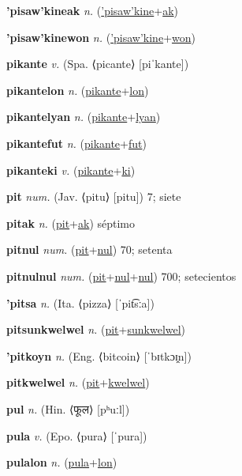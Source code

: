 \textbf{\hypertarget{'pisaw'kineak}{'pisaw'kineak}} \textit{n.} (\hyperlink{'pisaw'kine}{'pisaw'kine}+\allowbreak \hyperlink{ak}{ak})


\textbf{\hypertarget{'pisaw'kinewon}{'pisaw'kinewon}} \textit{n.} (\hyperlink{'pisaw'kine}{'pisaw'kine}+\allowbreak \hyperlink{won}{won})


\textbf{\hypertarget{pikante}{pikante}} \textit{v.} (Spa. ⟨picante⟩ [piˈkante])


\textbf{\hypertarget{pikantelon}{pikantelon}} \textit{n.} (\hyperlink{pikante}{pikante}+\allowbreak \hyperlink{lon}{lon})


\textbf{\hypertarget{pikantelyan}{pikantelyan}} \textit{n.} (\hyperlink{pikante}{pikante}+\allowbreak \hyperlink{lyan}{lyan})


\textbf{\hypertarget{pikantefut}{pikantefut}} \textit{n.} (\hyperlink{pikante}{pikante}+\allowbreak \hyperlink{fut}{fut})


\textbf{\hypertarget{pikanteki}{pikanteki}} \textit{v.} (\hyperlink{pikante}{pikante}+\allowbreak \hyperlink{ki}{ki})


\textbf{\hypertarget{pit}{pit}} \textit{num.} (Jav. ⟨pitu⟩ [pitu])
7; siete

\textbf{\hypertarget{pitak}{pitak}} \textit{n.} (\hyperlink{pit}{pit}+\allowbreak \hyperlink{ak}{ak})
séptimo

\textbf{\hypertarget{pitnul}{pitnul}} \textit{num.} (\hyperlink{pit}{pit}+\allowbreak \hyperlink{nul}{nul})
70; setenta

\textbf{\hypertarget{pitnulnul}{pitnulnul}} \textit{num.} (\hyperlink{pit}{pit}+\allowbreak \hyperlink{nul}{nul}+\allowbreak \hyperlink{nul}{nul})
700; setecientos

\textbf{\hypertarget{'pitsa}{'pitsa}} \textit{n.} (Ita. ⟨pizza⟩ [ˈpit͡sːa])


\textbf{\hypertarget{pitsunkwelwel}{pitsunkwelwel}} \textit{n.} (\hyperlink{pit}{pit}+\allowbreak \hyperlink{sunkwelwel}{sunkwelwel})


\textbf{\hypertarget{'pitkoyn}{'pitkoyn}} \textit{n.} (Eng. ⟨bitcoin⟩ [ˈbɪtkɔɪ̯n])


\textbf{\hypertarget{pitkwelwel}{pitkwelwel}} \textit{n.} (\hyperlink{pit}{pit}+\allowbreak \hyperlink{kwelwel}{kwelwel})


\textbf{\hypertarget{pul}{pul}} \textit{n.} (Hin. ⟨{\devanagari{}फूल}⟩ [pʰuːl])


\textbf{\hypertarget{pula}{pula}} \textit{v.} (Epo. ⟨pura⟩ [ˈpura])


\textbf{\hypertarget{pulalon}{pulalon}} \textit{n.} (\hyperlink{pula}{pula}+\allowbreak \hyperlink{lon}{lon})


